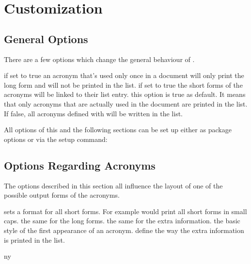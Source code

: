 \documentclass[DIV10,toc=index,toc=bib]{cnpkgdoc}
\begin{document}
\section{Customization}\label{sec:customization}
\subsection{General Options}
There are a few options which change the general behaviour of \acro.
\begin{beschreibung}
  if set to true an acronym that's used only
 once in a document will only print the long form and will not be printed in the
 list.
  if set to true the short forms of the
 acronyms will be linked to their list entry.
  this option is true as default. It means
 that only acronyms that are actually used in the document are printed in the list.
 If false, all acronyms defined with  will be written in the list.
\end{beschreibung}

All options of this and the following sections can be set up either as package
options or via the setup command:
\begin{beschreibung}
\end{beschreibung}

\subsection{Options Regarding Acronyms}
The options described in this section all influence the layout of one of the
possible output forms of the acronyms.
\begin{beschreibung}
  sets a format for all short forms. For example
  would print all short forms in small caps.
  the same for the long forms.
  the same for the extra information.
  the basic style of the first
 appearance of an acronym.
  define the way the extra
 information is printed in the list.
\end{beschreibung}

\begin{beispiel}
 \acf{ny}
\end{beispiel}
\end{document}
